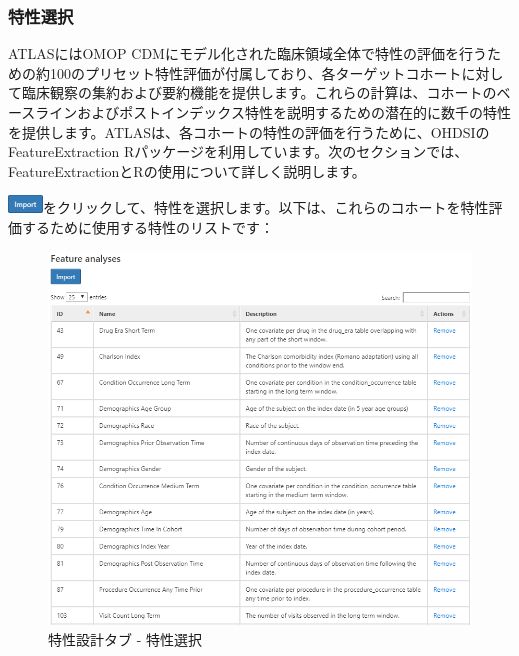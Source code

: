\documentclass[
  11pt]{book}
\theoremstyle{definition}
\theoremstyle{definition}
\theoremstyle{definition}
\theoremstyle{definition}
\theoremstyle{remark}
\begin{document}
\subsubsection*{特性選択}\label{ux7279ux6027ux9078ux629e}

ATLASにはOMOP CDMにモデル化された臨床領域全体で特性の評価を行うための約100のプリセット特性評価が付属しており、各ターゲットコホートに対して臨床観察の集約および要約機能を提供します。これらの計算は、コホートのベースラインおよびポストインデックス特性を説明するための潜在的に数千の特性を提供します。ATLASは、各コホートの特性の評価を行うために、OHDSIのFeatureExtraction Rパッケージを利用しています。次のセクションでは、FeatureExtractionとRの使用について詳しく説明します。

\includegraphics{images/Characterization/atlasImportButton.png}をクリックして、特性を選択します。以下は、これらのコホートを特性評価するために使用する特性のリストです：

\begin{figure}

{\centering \includegraphics[width=1\linewidth]{images/Characterization/atlasCharacterizationFeatureSelection} 

}

\caption{特性設計タブ - 特性選択}\label{fig:atlasCharacterizationFeatureSelection}
\end{figure}
\end{document}
